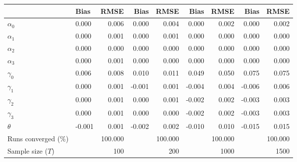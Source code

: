 
\begin{tabular}[t]{llrrrrrrr}
\toprule
  & Bias & RMSE & Bias & RMSE & Bias & RMSE & Bias & RMSE\\
\midrule
$\alpha_{0}$ & 0.000 & 0.006 & 0.000 & 0.004 & 0.000 & 0.002 & 0.000 & 0.002\\
$\alpha_{1}$ & 0.000 & 0.001 & 0.000 & 0.001 & 0.000 & 0.000 & 0.000 & 0.000\\
$\alpha_{2}$ & 0.000 & 0.000 & 0.000 & 0.000 & 0.000 & 0.000 & 0.000 & 0.000\\
$\alpha_{3}$ & 0.000 & 0.001 & 0.000 & 0.000 & 0.000 & 0.000 & 0.000 & 0.000\\
$\gamma_{0}$ & 0.006 & 0.008 & 0.010 & 0.011 & 0.049 & 0.050 & 0.075 & 0.075\\
$\gamma_{1}$ & 0.000 & 0.001 & -0.001 & 0.001 & -0.004 & 0.004 & -0.006 & 0.006\\
$\gamma_{2}$ & 0.000 & 0.001 & 0.000 & 0.001 & -0.002 & 0.002 & -0.003 & 0.003\\
$\gamma_{3}$ & 0.000 & 0.001 & 0.000 & 0.000 & -0.002 & 0.002 & -0.003 & 0.003\\
$\theta$ & -0.001 & 0.001 & -0.002 & 0.002 & -0.010 & 0.010 & -0.015 & 0.015\\
Runs converged (\%) &  & 100.000 &  & 100.000 &  & 100.000 &  & 100.000\\
Sample size ($T$) &  & 100 &  & 200 &  & 1000 &  & 1500\\
\bottomrule
\end{tabular}
